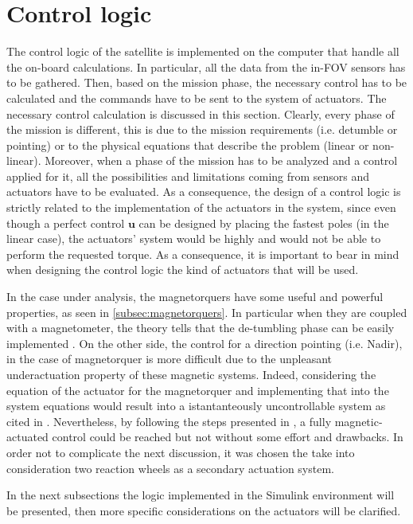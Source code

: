 \section{Control logic}
\label{sec:control_logic}

The control logic of the satellite is implemented on the computer that handle all the on-board calculations. In particular, all the data from the in-FOV sensors has to be 
gathered. Then, based on the mission phase, the necessary control has to be calculated and the commands have to be sent to the system of actuators. The necessary control calculation is 
discussed in this section. Clearly, every phase of the mission is different, this is due to the mission requirements (i.e. detumble or pointing) or to the physical 
equations that describe the problem (linear or non-linear). Moreover, when a phase of the mission has to be analyzed and a control applied for it, all the possibilities and limitations 
coming from sensors and actuators have to be evaluated. As a consequence, the design of a control logic is strictly related to the implementation of the actuators in the system, since
even though a perfect control $\boldsymbol{u}$ can be designed by placing the fastest poles (in the linear case), the actuators' system would be highly and would not be able 
to perform the requested torque. As a consequence, it is important to bear in mind when designing the control logic the kind of actuators that will be used.

In the case under analysis, the magnetorquers have some useful and powerful properties, as seen in \autoref{subsec:magnetorquers}. In particular when they are coupled with a magnetometer, the theory tells that
the de-tumbling phase can be easily implemented \cite{bdot}. On the other side, the control for a direction pointing (i.e. Nadir), in the case of magnetorquer is more difficult due to the unpleasant
underactuation property of these magnetic systems. Indeed, considering the equation of the actuator for the magnetorquer and implementing that into the system equations would result into a istantanteously
uncontrollable system as cited in \cite{lovera}. Nevertheless, by following the steps presented in \cite{lovera}, a fully magnetic-actuated control could be reached but not without some 
effort and drawbacks. In order not to complicate the next discussion, it was chosen the take into consideration two reaction wheels as a secondary actuation system.

In the next subsections the logic implemented in the Simulink environment will be presented, then more specific considerations on the actuators will be clarified.



